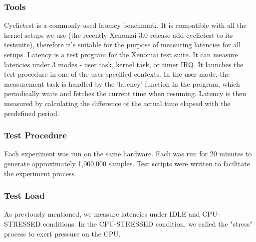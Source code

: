 \documentclass[10pt,a4paper]{article}
\begin{document}
\begin{multicols}{2}
\subsubsection{Tools}
Cyclictest is a commonly-used latency benchmark. It is compatible with all the kernel setups we use (the recently Xenomai-3.0 release add cyclictest to its testsuite), therefore it's suitable for the purpose of measuring latencies for all setups.
Latency is a test program for the Xenomai test suite. It can measure latencies under 3 modes - user task, kernel task, or timer IRQ. It launches the test procedure in one of the user-specified contexts. In the user mode, the measurement task is handled by the 'latency' function in the program, which periodically waits and fetches the current time when resuming. Latency is then measured by calculating the difference of the actual time elapsed with the predefined period.

\subsubsection{Test Procedure}
Each experiment was run on the same hardware. Each was run for 20 minutes to generate approximately 1,000,000 samples. Test scripts were written to facilitate the experiment process.
\subsubsection{Test Load}
As previously mentioned, we measure latencies under IDLE and CPU-STRESSED conditions. In the CPU-STRESSED condition, we called the "stress" process to exert pressure on the CPU.

\end{multicols}
\end{document}

